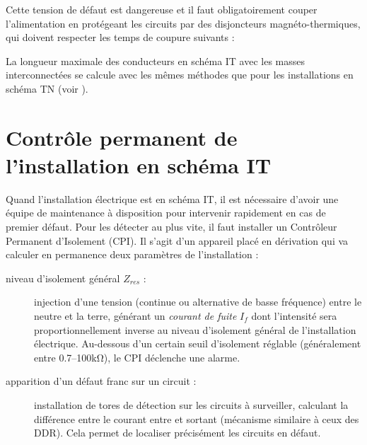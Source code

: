 Cette tension de défaut est dangereuse et il faut obligatoirement couper l'alimentation en protégeant les circuits par des disjoncteurs magnéto-thermiques, qui doivent respecter les temps de coupure suivants :



La longueur maximale des conducteurs en schéma IT avec les masses interconnectées se calcule avec les mêmes méthodes que pour les installations en schéma TN (voir ).

\section{Contrôle permanent de l'installation en schéma IT}

Quand l'installation électrique est en schéma IT, il est nécessaire d'avoir une équipe de maintenance à disposition pour intervenir rapidement en cas de premier défaut. Pour les détecter au plus vite, il faut installer un Contrôleur Permanent d'Isolement (CPI). Il s'agit d'un appareil placé en dérivation qui va calculer en permanence deux paramètres de l'installation :
\begin{description}
\item[ niveau d'isolement général $Z_{res}$ :] injection d'une tension (continue ou alternative de basse fréquence) entre le neutre et la terre, générant un \emph{courant de fuite} $I_f$ dont l'intensité sera proportionnellement inverse au niveau d'isolement général de l'installation électrique. Au-dessous d'un certain seuil d'isolement réglable (généralement entre \numrange{0,7}{100}\si{\kilo\ohm}), le CPI déclenche une alarme. 
\item[ apparition d'un défaut franc sur un circuit :] installation de tores de détection sur les circuits à surveiller, calculant la différence entre le courant entre et sortant (mécanisme similaire à ceux des DDR). Cela permet de localiser précisément les circuits en défaut.
\end{description} 

 \begin{figure}[H]
\caption{Installation Isolé-Individuelle avec CPI}
\begin{subfigure}[t]{0.49\linewidth}

\end{subfigure}
\begin{subfigure}[t]{0.49\linewidth}

\end{subfigure}
\end{figure}

